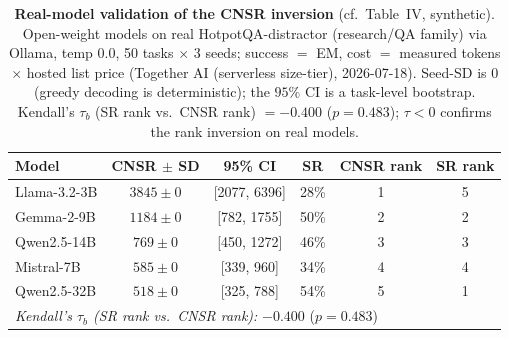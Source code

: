 \begin{table}[t]
\centering
\caption{\textbf{Real-model validation of the CNSR inversion} (cf.\ Table~IV, synthetic). Open-weight models on real HotpotQA-distractor (research/QA family) via Ollama, temp 0.0, 50 tasks $\times$ 3 seeds; success $=$ EM, cost $=$ measured tokens $\times$ hosted list price (Together AI (serverless size-tier), 2026-07-18). Seed-SD is $0$ (greedy decoding is deterministic); the $95\%$ CI is a task-level bootstrap. Kendall's $\tau_b$ (SR rank vs.\ CNSR rank) $=-0.400$ ($p=0.483$); $\tau<0$ confirms the rank inversion on real models.}
\label{tab:cnsr_ollama_real}
\begin{tabular}{lccccc}
\toprule
Model & CNSR $\pm$ SD & 95\% CI & SR & CNSR rank & SR rank \\
\midrule
Llama-3.2-3B & $3845 \pm 0$ & [2077, 6396] & 28\% & 1 & 5 \\
Gemma-2-9B & $1184 \pm 0$ & [782, 1755] & 50\% & 2 & 2 \\
Qwen2.5-14B & $769 \pm 0$ & [450, 1272] & 46\% & 3 & 3 \\
Mistral-7B & $585 \pm 0$ & [339, 960] & 34\% & 4 & 4 \\
Qwen2.5-32B & $518 \pm 0$ & [325, 788] & 54\% & 5 & 1 \\
\midrule
\multicolumn{6}{l}{\textit{Kendall's $\tau_b$ (SR rank vs.\ CNSR rank):} $-0.400$ ($p=0.483$)} \\
\bottomrule
\end{tabular}
\end{table}
